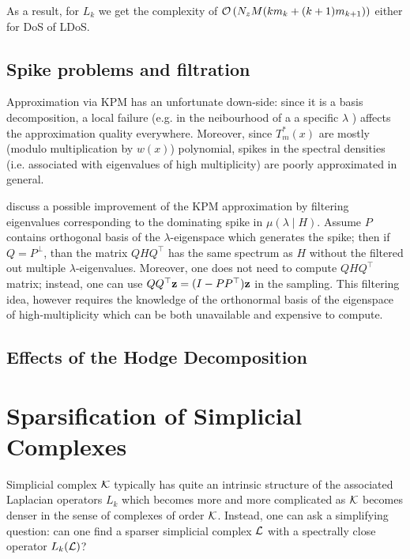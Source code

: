 \documentclass{mynotes}
\begin{document}
As a result, for  \( L_k \) we get the complexity of \( \mathcal{O} \left( N_z M ( k m_k + (k+1)m_{k+1}) \right)\) either for DoS of LDoS.

\section{ Spike problems and filtration }

Approximation via KPM has an unfortunate down-side: since it is a basis decomposition, a local failure (e.g. in the neibourhood of a a specific \( \lambda \) ) affects the approximation quality everywhere. Moreover, since \( T^*_m(x)\) are mostly (modulo multiplication by \( w(x) \)) polynomial, spikes in the spectral densities (i.e. associated with eigenvalues of high multiplicity) are poorly approximated in general. 

\cite{dong2019network} discuss a possible improvement of the KPM approximation by filtering eigenvalues corresponding to the dominating spike in \( \mu( \lambda \mid H )\). Assume \( P \) contains orthogonal basis of the \(\lambda\)-eigenspace which generates the spike; then if \( Q = P^\perp \), than the matrix \( Q H Q^\top \) has the same spectrum as \( H \) without the filtered out multiple \( \lambda \)-eigenvalues. Moreover, one does not need to compute \( Q H Q^\top \) matrix; instead, one can use \( Q Q^\top \mathbf{z} = ( I - P P^\top ) \mathbf{z} \) in the sampling. This filtering idea, however requires the knowledge of the orthonormal basis of the eigenspace of high-multiplicity which can be both unavailable and expensive to compute. 




\section{ Effects of the Hodge Decomposition }




\chapter{ Sparsification of Simplicial Complexes }

Simplicial complex \( \mathcal{K} \) typically has quite an intrinsic structure of the associated Laplacian operators \( L_k \) which becomes more and more complicated as \( \mathcal{K} \) becomes denser in the sense of complexes of order \( \mathcal{K} \). Instead, one can ask a simplifying question: can one find a sparser simplicial complex \( \mathcal{L} \) with a spectrally close operator \( L_k (\mathcal{L} )\)?
\end{document}
